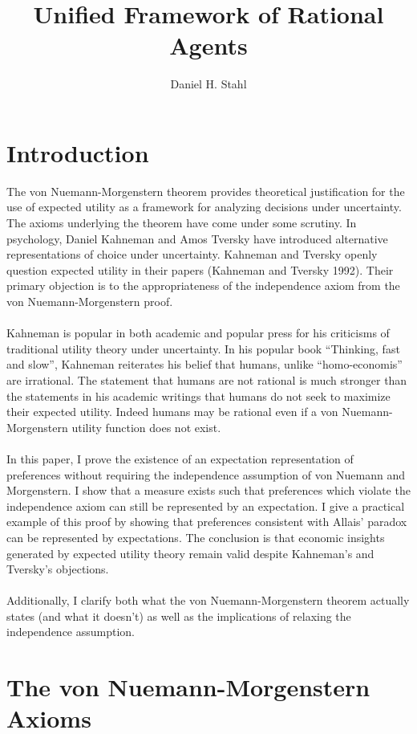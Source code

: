 \documentclass{article}
\begin{document}
	
	
\title{Unified Framework of Rational Agents}
\date{}
\author{Daniel H. Stahl}

\section{Introduction}

The von Nuemann-Morgenstern theorem provides theoretical justification for the use of expected utility as a framework for analyzing decisions under uncertainty.  The axioms underlying the theorem have come under some scrutiny.  In psychology, Daniel Kahneman and Amos Tversky have introduced alternative representations of choice under uncertainty.  Kahneman and Tversky openly question expected utility in their papers (Kahneman and Tversky 1992).  Their primary objection is to the appropriateness of the independence axiom from the von Nuemann-Morgenstern proof.    
\\
\\
Kahneman is popular in both academic and popular press for his criticisms of traditional utility theory under uncertainty.  In his popular book ``Thinking, fast and slow'', Kahneman reiterates his belief that humans, unlike ``homo-economis'' are irrational.  The statement that humans are not rational is much stronger than the statements in his academic writings that humans do not seek to maximize their expected utility.  Indeed humans may be rational even if a von Nuemann-Morgenstern utility function does not exist.  
\\
\\
In this paper, I prove the existence of an expectation representation of preferences without requiring the independence assumption of von Nuemann and Morgenstern.  I show that a measure exists such that preferences which violate the independence axiom can still be represented by an expectation.  I give a practical example of this proof by showing that preferences consistent with Allais' paradox can be represented by expectations.  The conclusion is that economic insights generated by expected utility theory remain valid despite Kahneman's and Tversky's objections.   
\\
\\
Additionally, I clarify both what the von Nuemann-Morgenstern theorem actually states (and what it doesn't) as well as the implications of relaxing the independence assumption.


\section{The von Nuemann-Morgenstern Axioms}
\end{document}
